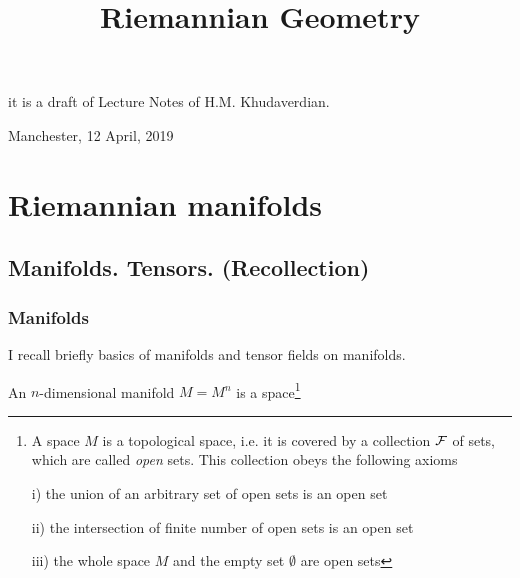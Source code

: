 \documentclass[12pt]{article}
\title{Riemannian Geometry}
\date{}
\theoremstyle{theorem}
\numberwithin{equation}{section}
\begin{document}
\maketitle

  \centerline {it is a draft of Lecture Notes of H.M. Khudaverdian.}

  \centerline { Manchester, 12 April,  2019}





\tableofcontents
{}
\newpage
{}




\section {Riemannian manifolds}


\subsection { Manifolds. Tensors. (Recollection)}

\subsubsection{Manifolds}



I recall briefly basics of manifolds 
and tensor fields on manifolds.

An $n$-dimensional manifold $M=M^n$ is a 
space\footnote
{A space $M$ is a topological space, i.e. it 
is covered by a collection $\cal F$ of sets,
which are called {\it open} sets.  This collection
obeys the following axioms

i) the union of an arbitrary set of open sets
is an open set

ii) the intersection of finite number of open sets
is an open set

iii) the whole space $M$ and the empty set 
$\emptyset$ are open sets
} 
\end{document}
